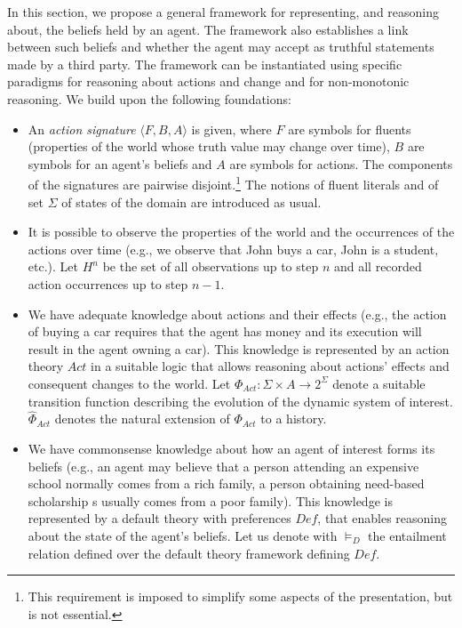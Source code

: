 \documentclass{article}
\begin{document}
In this section, we propose a general framework for representing, and reasoning about, the beliefs held by an agent. The framework also establishes a link between such beliefs and whether the agent may accept as truthful statements made by a third party. The
framework  can be instantiated using specific paradigms for reasoning about actions and change and for non-monotonic reasoning. We build upon the following foundations:
%
 \begin{itemize}
%
\item An \emph{action signature} $\langle F,B,A \rangle$ is given, where $F$ are symbols for fluents (properties of the world whose truth value may change over time),
        $B$ are symbols for an agent's beliefs and $A$ are symbols for actions. The components of the signatures are pairwise disjoint.\footnote{This requirement is imposed to simplify some aspects of the presentation, but is not essential.} The notions of fluent literals and of set $\Sigma$ of states of the domain are introduced as usual.
\item It is possible to  observe the properties of the world and the occurrences of the actions    over time
        (e.g., we observe that John buys a car, John is a student, etc.). 
        Let $H^n$ be the set of all observations up to step $n$ and all recorded action occurrences up to step $n-1$.
 
\item We have adequate knowledge about actions  and their effects (e.g., the action of buying a car requires that the agent has money and its execution will result in the agent owning a car). This knowledge is represented by an action theory $Act$ in a suitable logic that allows reasoning about actions' effects and consequent changes to the world. 
        Let $\Phi_{Act}: \Sigma \times A \rightarrow 2^\Sigma$ denote a suitable transition function describing the evolution of the dynamic system of interest. $\hat\Phi_{Act}$ denotes the natural extension of $\Phi_{Act}$ to a history. %

\item We have commonsense knowledge about how an agent of interest forms its beliefs (e.g., an agent may believe that a person attending an expensive school normally comes from a rich family, a person obtaining need-based scholarship s  usually comes from a poor family).
This knowledge is represented by a default theory with preferences $\textit{Def}$,  that enables reasoning about the state of the agent's beliefs. Let us denote with $\models_D$ the entailment relation defined over the default theory framework defining $\textit{Def}$.  
 
\end{itemize} 
\end{document}
